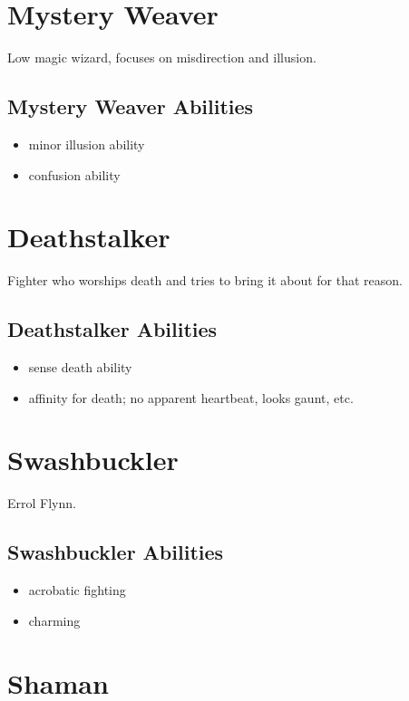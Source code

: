 \begin{multicols}{2}
\section{Mystery Weaver}

Low magic wizard, focuses on misdirection and illusion.

\subsection{Mystery Weaver Abilities}

\begin{itemize}
    \item minor illusion ability
    \item confusion ability
\end{itemize}

\section{Deathstalker}

Fighter who worships death and tries to bring it about for that reason.

\subsection{Deathstalker Abilities}

\begin{itemize}
    \item sense death ability
    \item affinity for death; no apparent heartbeat, looks gaunt, etc.
\end{itemize}

\section{Swashbuckler}

Errol Flynn.

\subsection{Swashbuckler Abilities}

\begin{itemize}
    \item acrobatic fighting
    \item charming
\end{itemize}

\section{Shaman}


\end{multicols}
